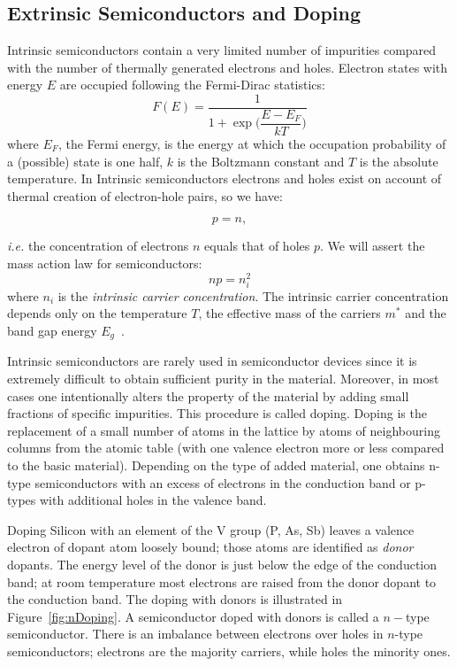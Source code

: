 \subsection{Extrinsic Semiconductors and Doping}

Intrinsic semiconductors contain a very limited number of impurities  compared with the number of 
thermally generated electrons and holes. 
Electron states with energy $E$ are occupied following the Fermi-Dirac statistics:
\begin{equation}
F(E)=\dfrac{1}{1+\exp{\Bigg(\dfrac{E-E_F}{kT}}\Bigg)}
\label{eq:FermiDirac}	
\end{equation}
where $E_F$, the Fermi energy, is the energy at which the occupation probability of a (possible) 
state is one half, $k$ is the Boltzmann constant and $T$ is the absolute temperature. 
In Intrinsic semiconductors electrons and holes exist on account of thermal creation of electron-hole 
pairs, so we have:

\begin{equation}
p=n,
\label{eq:n=p}
\end{equation}

{\it i.e.} the concentration of electrons $n$ equals that of holes $p$. 
We will assert the mass action law for semiconductors:
\begin{equation}
np=n_i^2
\label{eq:massLawAction}
\end{equation} 
where $n_i$ is the {\it intrinsic carrier concentration}. The intrinsic carrier concentration depends only 
on the temperature $T$, the effective mass of the carriers $m^*$ 
and the band gap energy 
$E_g$~\cite{Lutz:411172}.


Intrinsic semiconductors are rarely used in semiconductor 
devices since it is extremely difficult to obtain sufficient purity in the material. Moreover, in most cases 
one intentionally alters the property of the material by adding small fractions of specific impurities. 
This procedure is called doping.  Doping is the replacement of a small number of atoms in the lattice by 
atoms of neighbouring columns from the atomic table (with one valence electron more or less compared 
to the basic material). Depending on the type of added material, one obtains n-type 
semiconductors with an excess of electrons in the conduction band or p-types with additional holes in 
the valence band. 

Doping Silicon with an element of the V group (P, As, Sb) leaves a valence electron of dopant atom 
loosely bound; those atoms are identified  
as {\it donor} dopants. The energy level of the donor is just below the edge of the conduction band; 
at room temperature most electrons are raised from the donor dopant to the conduction band.  
The doping with donors  is illustrated in Figure~\ref{fig:nDoping}. A semiconductor doped with 
donors is called a $n-$type semiconductor. There is an imbalance between 
electrons over holes in $n$-type semiconductors; electrons are the majority carriers, while holes the
minority ones. 


